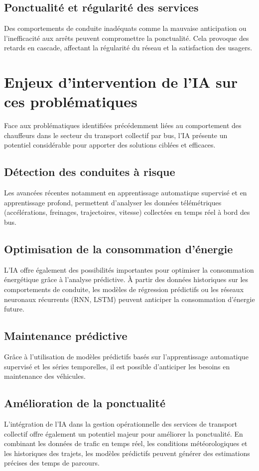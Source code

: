 \documentclass[a4paper, 12pt]{book}
\begin{document}
\subsection{Ponctualité et régularité des services}
Des comportements de conduite inadéquats comme la mauvaise anticipation ou l'inefficacité aux arrêts peuvent compromettre la ponctualité. Cela provoque des retards en cascade, affectant la régularité du réseau et la satisfaction des usagers.

\section{Enjeux d'intervention de l'IA sur ces problématiques}

Face aux problématiques identifiées précédemment liées au comportement des chauffeurs dans le secteur du transport collectif par bus, l'IA présente un potentiel considérable pour apporter des solutions ciblées et efficaces.

\subsection{Détection des conduites à risque}
Les avancées récentes notamment en apprentissage automatique supervisé et en apprentissage profond, permettent d'analyser les données télémétriques (accélérations, freinages, trajectoires, vitesse) collectées en temps réel à bord des bus.

\subsection{Optimisation de la consommation d'énergie}
L'IA offre également des possibilités importantes pour optimiser la consommation énergétique grâce à l'analyse prédictive. À partir des données historiques sur les comportements de conduite, les modèles de régression prédictifs ou les réseaux neuronaux récurrents (RNN, LSTM) peuvent anticiper la consommation d'énergie future.

\subsection{Maintenance prédictive}
Grâce à l'utilisation de modèles prédictifs basés sur l'apprentissage automatique supervisé et les séries temporelles, il est possible d'anticiper les besoins en maintenance des véhicules.

\subsection{Amélioration de la ponctualité}
L'intégration de l'IA dans la gestion opérationnelle des services de transport collectif offre également un potentiel majeur pour améliorer la ponctualité. En combinant les données de trafic en temps réel, les conditions météorologiques et les historiques des trajets, les modèles prédictifs peuvent générer des estimations précises des temps de parcours.
\end{document}
